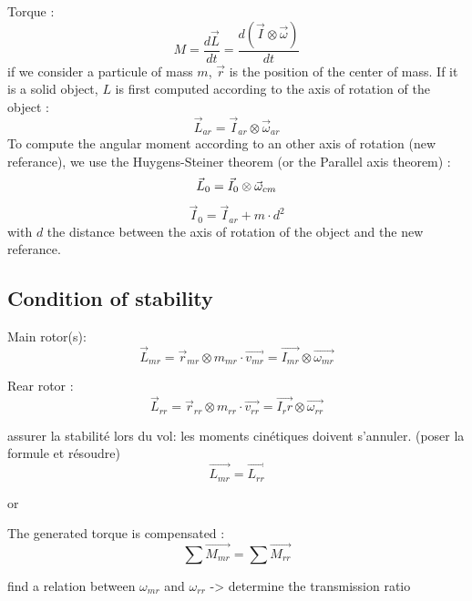 \documentclass[12pt,a4paper]{article}
\begin{document}
	Torque : 
	\begin{equation}
		M = \frac{d\vec{L}}{dt}=\frac{d(\vec{I} \otimes \vec{\omega})}{dt}
	\end{equation}
	\medbreak
	if we consider a particule of mass $m$, $\vec{r}$ is the position of the center of mass.
	If it is a solid object, $L$ is first computed according to the axis of rotation of the object : 
	\begin{equation}
		\vec{L}_{ar}=\vec{I}_{ar} \otimes \vec{\omega}_{ar}
	\end{equation}
	To compute the angular moment according to an other axis of rotation (new referance), we use the Huygens-Steiner theorem (or the Parallel axis theorem) : 
	\begin{equation}
		\vec{L}_{0}=\vec{I}_{0} \otimes \vec{\omega}_{cm}\\
	\end{equation}
	\begin{equation}
		\vec{I}_{0} = \vec{I}_{ar} + m\cdot d^2
	\end{equation}
	with $d$ the distance between the axis of rotation of the object and the new referance. 
	\subsection{Condition of stability}
	
	Main rotor(s):
	\begin{equation}
		\vec{L}_{mr}=\vec{r}_{mr} \otimes m_{mr} \cdot \vec{v_{mr}}=\vec{I_{mr}} \otimes \vec{\omega_{mr}}
	\end{equation}
	
	
	Rear rotor : 
	\begin{equation}
		\vec{L}_{rr}=\vec{r}_{rr} \otimes m_{rr} \cdot \vec{v_{rr}}=\vec{I_rr} \otimes \vec{\omega_{rr}}
	\end{equation}
	
	assurer la stabilité lors du vol: les moments cinétiques doivent s'annuler. (poser la formule et résoudre)
	\begin{equation}
		\vec{L_{mr}}=\vec{L_{rr}}
	\end{equation}
	
	or
	
	The generated torque is compensated : 
	\begin{equation}
		\sum \vec{M_{mr}}=\sum \vec{M_{rr}}
	\end{equation}
	
	find a relation between $\omega_{mr}$ and $\omega_{rr}$ -> determine the transmission ratio
	
\end{document}
